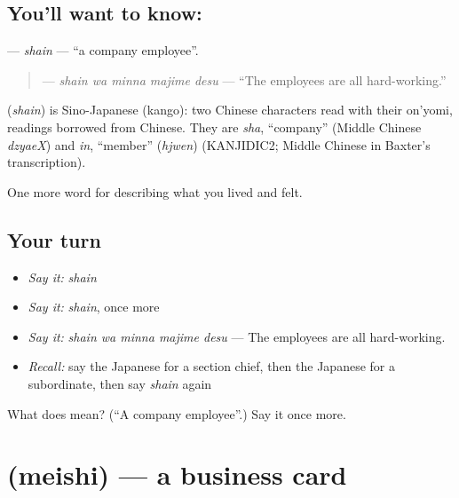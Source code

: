 \subsection*{You'll want to know: }
\textbf{} — \emph{shain} — \textquotedblleft{}a company employee\textquotedblright{}.

\begin{quote}
\textbf{  } — \emph{shain wa minna majime desu} — \textquotedblleft{}The employees are all hard-working.\textquotedblright{}
\end{quote}

\begin{cousinweb}
\textbf{} (\emph{shain}) is Sino-Japanese (kango): two Chinese characters read with their on'yomi, readings borrowed from Chinese. They are \emph{sha}, \textquotedblleft{}company\textquotedblright{} (Middle Chinese \emph{dzyaeX}) and \emph{in}, \textquotedblleft{}member\textquotedblright{} (\emph{hjwen}) (KANJIDIC2; Middle Chinese in Baxter's transcription).
\end{cousinweb}

\begin{grammarlens}[title={What you've built}]
One more word for describing what you lived and felt.
\end{grammarlens}

\subsection*{Your turn}
\begin{itemize}
\raggedright
  \item \emph{Say it:} \emph{shain}
  \item \emph{Say it:} \emph{shain}, once more
  \item \emph{Say it:} \emph{shain wa minna majime desu} — The employees are all hard-working.
  \item \emph{Recall:} say the Japanese for a section chief, then the Japanese for a subordinate, then say \emph{shain} again
\end{itemize}

\begin{tcolorbox}[breakable,colback=teal!4,colframe=teal!35!black,title={Before you move on}]
What does  mean? (\textquotedblleft{}A company employee\textquotedblright{}.) Say it once more.
\end{tcolorbox}
\section[\texorpdfstring{\ja{めいし} (meishi)}{めいし (meishi)}]{ (meishi) — a business card}

